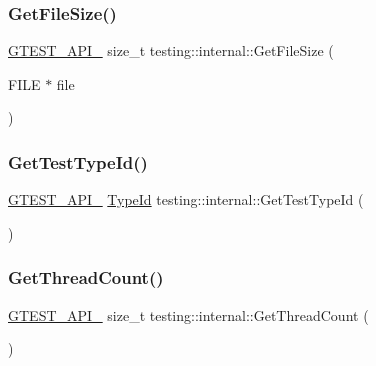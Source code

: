 \mbox{\label{namespacetesting_1_1internal_a40bcfd87e26aae36e0cc51e5db64fd89}} 
\subsubsection{\texorpdfstring{GetFileSize()}{GetFileSize()}}
{\footnotesize\ttfamily \mbox{\hyperlink{gtest-port_8h_aa73be6f0ba4a7456180a94904ce17790}{G\+T\+E\+S\+T\+\_\+\+A\+P\+I\+\_\+}} size\+\_\+t testing\+::internal\+::\+Get\+File\+Size (\begin{DoxyParamCaption}\item[{F\+I\+LE $\ast$}]{file }\end{DoxyParamCaption})}

\mbox{\label{namespacetesting_1_1internal_a1e85cf16bb95b60f879d48ba1fbfc1c9}} 
\subsubsection{\texorpdfstring{GetTestTypeId()}{GetTestTypeId()}}
{\footnotesize\ttfamily \mbox{\hyperlink{gtest-port_8h_aa73be6f0ba4a7456180a94904ce17790}{G\+T\+E\+S\+T\+\_\+\+A\+P\+I\+\_\+}} \mbox{\hyperlink{namespacetesting_1_1internal_ab1114197d3c657d8b7f8e0c5caa12d00}{Type\+Id}} testing\+::internal\+::\+Get\+Test\+Type\+Id (\begin{DoxyParamCaption}{ }\end{DoxyParamCaption})}

\mbox{\label{namespacetesting_1_1internal_a8cbd8bf820517923d7f3c4477b3af5fa}} 
\subsubsection{\texorpdfstring{GetThreadCount()}{GetThreadCount()}}
{\footnotesize\ttfamily \mbox{\hyperlink{gtest-port_8h_aa73be6f0ba4a7456180a94904ce17790}{G\+T\+E\+S\+T\+\_\+\+A\+P\+I\+\_\+}} size\+\_\+t testing\+::internal\+::\+Get\+Thread\+Count (\begin{DoxyParamCaption}{ }\end{DoxyParamCaption})}

